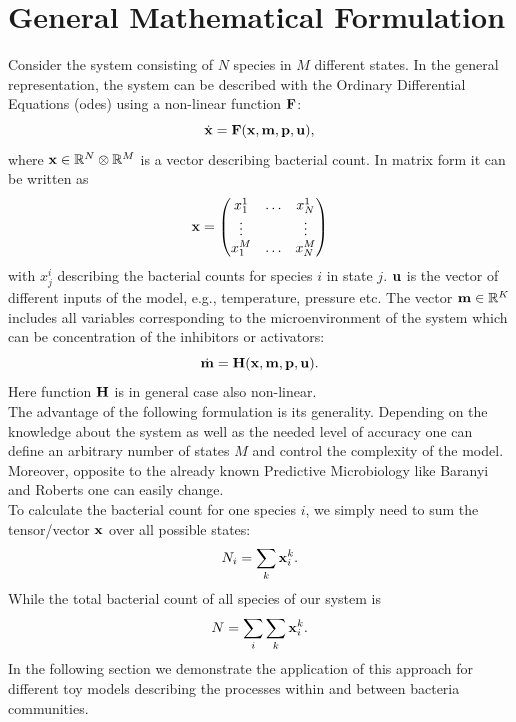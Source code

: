 \documentclass[10pt,A4paper]{article}
\begin{document}
\section{General Mathematical Formulation}
Consider the system consisting of $N$ species in $M$ different states.
In the general representation, the system can be described with the Ordinary Differential Equations (\acp{ode}) using a non-linear function $\mathbf{F}$:
\begin{equation}
   \dot{\mathbf{x}} = \mathbf{F}(\mathbf{x}, \mathbf{m}, \mathbf{p}, \mathbf{u}),
   \label{eq:model_ODE}
\end{equation}
where  $\mathbf{x} \in \mathbb{R}^{N}  \otimes \mathbb{R}^{M}$ is a vector describing bacterial count.
In matrix form it can be written as
\begin{equation}
    \mathbf{x} = \begin{pmatrix}
        x^1_1  & \dots & x^1_N  \\
        \vdots &       & \vdots \\
        x^M_1  & \dots & x^M_N  \\
            \end{pmatrix}
    \label{eq:model_bact}
\end{equation}
with $x_{j}^{i}$ describing the bacterial counts for species $i$ in state $j$.
$\mathbf{u}$ is the vector of different inputs of the model, e.g., temperature, pressure etc.
The vector $\mathbf{m} \in \mathbb{R}^{K}$ includes all variables corresponding to the microenvironment of the system which can be concentration of the inhibitors or activators:
\begin{equation}
    \dot{\mathbf{m}} = \mathbf{H} (\mathbf{x}, \mathbf{m}, \mathbf{p}, \mathbf{u}).
    \label{eq:model_microenv}
\end{equation}
Here function $\mathbf{H}$ is in general case also non-linear.\\
%
The advantage of the following formulation is its generality.
Depending on the knowledge about the system as well as the needed level of accuracy one can define an arbitrary number of states $M$ and control the complexity of the model.
Moreover, opposite to the already known Predictive Microbiology like Baranyi and Roberts one can easily change.\\
%
To calculate the bacterial count for one species $i$, we simply need to sum the tensor/vector $\mathbf{x}$ over all possible states:
\begin{equation}
    N_i = \sum_k \mathbf{x}_i^k.
\end{equation}
While the total bacterial count of all species of our system is
\begin{equation}
    N = \sum_i \sum_k \mathbf{x}_i^k.
\end{equation}
In the following section we demonstrate the application of this approach for different toy models describing the processes within and between bacteria communities.
%
%
%
%
\end{document}

